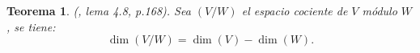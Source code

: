 \documentclass[12pt]{book}
\newtheorem{theorem}{Teorema}[section]
\theoremstyle{definition}
\newtheorem{definition}[theorem]{Definición}
\DeclareMathOperator{\im}{im}
\newcounter{in}
\newcounter{ini}
\begin{document}

\begin{theorem}{\normalfont (\cite{herstein1990algebra}, lema 4.8, p.168)}.
  \label{dim-esp-coc}
  Sea $(V/W)$ el espacio cociente de $V$ módulo $W$, se tiene:
  $$\dim(V/W)=\dim(V)-\dim(W).$$
\end{theorem}



\end{document}
